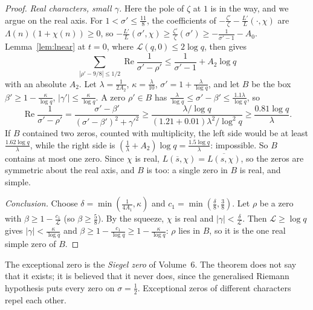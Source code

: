 \begin{proof}
\emph{Real characters, small $\gamma$.} Here the pole of $\zeta$ at $1$ is in the way, and we argue on the real axis. For $1<\sigma'\le\frac{11}8$, the coefficients of $-\frac{\zeta'}\zeta-\frac{L'}L(\cdot,\chi)$ are $\Lambda(n)(1+\chi(n))\ge0$, so $-\frac{L'}L(\sigma',\chi)\ge\frac{\zeta'}\zeta(\sigma')\ge-\frac1{\sigma'-1}-A_0$. Lemma~\ref{lem:lnear} at $t=0$, where $\mathcal L(q,0)\le2\log q$, then gives
\[
\sum_{|\rho'-9/8|\le1/2}\operatorname{Re}\frac1{\sigma'-\rho'}\le\frac1{\sigma'-1}+A_2\log q
\]
with an absolute $A_2$. Let $\lambda=\frac1{2A_2}$, $\kappa=\frac\lambda{10}$, $\sigma'=1+\frac\lambda{\log q}$, and let $B$ be the box $\beta'\ge1-\frac\kappa{\log q}$, $|\gamma'|\le\frac\kappa{\log q}$. A zero $\rho'\in B$ has $\frac\lambda{\log q}\le\sigma'-\beta'\le\frac{1.1\lambda}{\log q}$, so
\[
\operatorname{Re}\frac1{\sigma'-\rho'}=\frac{\sigma'-\beta'}{(\sigma'-\beta')^2+\gamma'^2}\ge\frac{\lambda/\log q}{(1.21+0.01)\lambda^2/\log^2q}\ge\frac{0.81\log q}\lambda .
\]
If $B$ contained two zeros, counted with multiplicity, the left side would be at least $\frac{1.62\log q}\lambda$, while the right side is $(\frac1\lambda+A_2)\log q=\frac{1.5\log q}\lambda$: impossible. So $B$ contains at most one zero. Since $\chi$ is real, $L(\overline s,\chi)=\overline{L(s,\chi)}$, so the zeros are symmetric about the real axis, and $B$ is too: a single zero in $B$ is real, and simple.

\emph{Conclusion.} Choose $\delta=\min(\frac1{4A_1},\kappa)$ and $c_1=\min(\frac\delta8,\frac38)$. Let $\rho$ be a zero with $\beta\ge1-\frac{c_1}{\mathcal L}$ (so $\beta\ge\frac58$). By the squeeze, $\chi$ is real and $|\gamma|<\frac\delta{\mathcal L}$. Then $\mathcal L\ge\log q$ gives $|\gamma|<\frac\kappa{\log q}$ and $\beta\ge1-\frac{c_1}{\log q}\ge1-\frac\kappa{\log q}$: $\rho$ lies in $B$, so it is the one real simple zero of $B$.
\end{proof}

The exceptional zero is the \emph{Siegel zero} of Volume~6. The theorem does not say that it exists; it is believed that it never does, since the generalised Riemann hypothesis puts every zero on $\sigma=\frac12$. Exceptional zeros of different characters repel each other.


